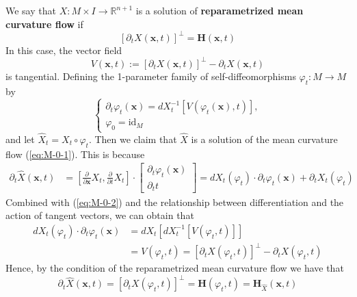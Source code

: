 We say that $X:M\times I\to\mathbb{R}^{n+1}$ is a solution of \textbf{reparametrized mean curvature
flow} if
\begin{equation*}
    {\left[\partial_t X(\boldsymbol{x},t)\right]}^{\bot}=\boldsymbol{H}(\boldsymbol{x},t)
\end{equation*}
In this case, the vector field
\begin{equation*}
    V(\boldsymbol{x},t):={\left[\partial_t X(\boldsymbol{x},t)\right]}^{\bot}-\partial_t X(\boldsymbol{x},t)
\end{equation*}
is tangential. Defining the 1-parameter family of self-diffeomorphisms $\varphi_t:M\to M$ by
\begin{equation}\label{eq:M-0-2}
    \begin{cases}
        \partial_t\varphi_t(\boldsymbol{x})=dX^{-1}_t[V(\varphi_t(\boldsymbol{x}),t)],\\
        \varphi_0=\mathrm{id}_M
    \end{cases}
\end{equation}
and let $\hat{X}_t=X_t\circ\varphi_t$. Then we claim that $\hat{X}$ is a solution of the mean curvature flow (\ref{eq:M-0-1}). This is because
\begin{align*}
    \partial_t\hat{X}(\boldsymbol{x},t)&=\left[\frac{\partial}{\partial\boldsymbol{x}}X_t,\frac{\partial}{\partial t}X_t\right]\cdot\left[\begin{array}{c}
        \partial_t\varphi_t(\boldsymbol{x})\\
        \partial_t t
    \end{array}\right]=dX_t(\varphi_t)\cdot\partial_t\varphi_t(\boldsymbol{x})+\partial_t X_t(\varphi_t)
\end{align*}
Combined with (\ref{eq:M-0-2}) and the relationship between differentiation and the action of tangent vectors, we can obtain that
\begin{align*}
    dX_t(\varphi_t)\cdot\partial_t\varphi_t(\boldsymbol{x})&=dX_t[dX^{-1}_t[V(\varphi_t,t)]]\\
    &=V(\varphi_t,t)={\left[\partial_t X(\varphi_t,t)\right]}^{\bot}-\partial_t X(\varphi_t,t)
\end{align*}
Hence, by the condition of the reparametrized mean curvature flow we have that
\begin{equation*}
    \partial_t \hat{X}(\boldsymbol{x},t)={\left[\partial_t X(\varphi_t,t)\right]}^{\bot}=\boldsymbol{H}(\varphi_t,t)=\boldsymbol{H}_{\hat{X}}(\boldsymbol{x},t)
\end{equation*}

